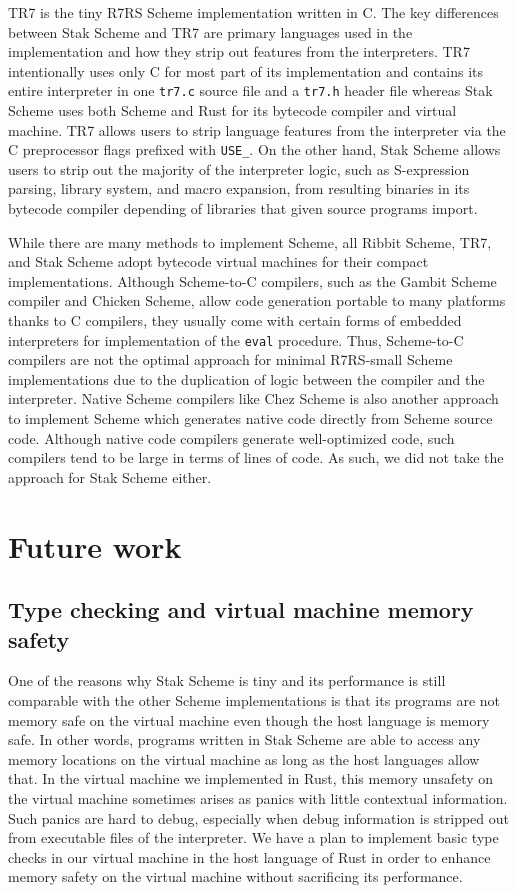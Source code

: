 \documentclass[sigplan, anonymous, review]{acmart}
\begin{document}
TR7 \cite{tr7} is the tiny R7RS Scheme implementation written in C.
The key differences between Stak Scheme and TR7 are primary languages used in
the implementation and how they strip out features from the
interpreters.
TR7 intentionally uses only C for most part of its implementation and
contains its entire interpreter in one \texttt{tr7.c} source file and a
\texttt{tr7.h} header file whereas Stak Scheme uses both Scheme and
Rust for its bytecode compiler and virtual machine.
TR7 allows users to strip language features from the interpreter via
the C preprocessor flags prefixed with \texttt{USE\_}.
On the other hand, Stak Scheme allows users to strip out the majority of
the interpreter logic, such as S-expression parsing, library system, and
macro expansion, from resulting binaries in its bytecode compiler
depending of libraries that given source programs import.

While there are many methods to implement Scheme, all Ribbit Scheme,
TR7, and Stak Scheme adopt bytecode virtual machines for their
compact implementations.
Although Scheme-to-C compilers, such as the Gambit Scheme compiler and
Chicken Scheme, allow code generation portable to many platforms
thanks to C compilers, they usually come with certain forms of embedded
interpreters for implementation of the \texttt{eval} procedure.
Thus, Scheme-to-C compilers are not the optimal approach for minimal
R7RS-small Scheme implementations due to the duplication of logic between the
compiler and the interpreter.
Native Scheme compilers like Chez Scheme is also another approach to
implement Scheme which generates native code directly from Scheme source code.
Although native code compilers generate well-optimized code, such
compilers tend to be large in terms of lines of code.
As such, we did not take the approach for Stak Scheme either.

\section{Future work}

\subsection{Type checking and virtual machine memory safety}

One of the reasons why Stak Scheme is tiny and its performance is still
comparable with the other Scheme implementations is that its
programs are not memory safe on the virtual machine even though
the host language is memory safe.
In other words, programs written in Stak Scheme are able to access any memory
locations on the virtual machine as long as the host languages allow that.
In the virtual machine we implemented in Rust, this memory
unsafety on the virtual machine sometimes arises as panics with little
contextual information.
Such panics are hard to debug, especially when debug information is
stripped out from executable files of the interpreter.
We have a plan to implement basic type checks in our virtual machine
in the host language of Rust in order to enhance memory safety on
the virtual machine without sacrificing its performance.
\end{document}
